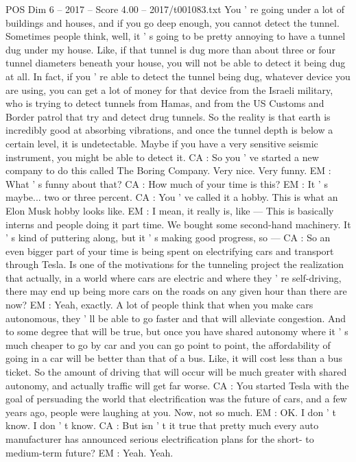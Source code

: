 \begin{textsample}{POS Dim 6 – 2017 – Score 4.00 – 2017/t001083.txt}
You ' re going under a lot of buildings and houses, and if you go deep enough, you cannot detect the tunnel.
Sometimes people think, well, it ' s going to be pretty annoying to have a tunnel dug under my house.
Like, if that tunnel is dug more than about three or four tunnel diameters beneath your house, you will not be able to detect it being dug at all.
In fact, if you ' re able to detect the tunnel being dug, whatever device you are using, you can get a lot of money for that device from the Israeli military, who is trying to detect tunnels from Hamas, and from the US Customs and Border patrol that try and detect drug tunnels.
So the reality is that earth is incredibly good at absorbing vibrations, and once the tunnel depth is below a certain level, it is undetectable.
Maybe if you have a very sensitive seismic instrument, you might be able to detect it.
CA : So you ' ve started a new company to do this called The Boring Company.
Very nice.
Very funny.
EM : What ' s funny about that?
CA : How much of your time is this?
EM : It ' s maybe... two or three percent.
CA : You ' ve called it a hobby.
This is what an Elon Musk hobby looks like.
EM : I mean, it really is, like — This is basically interns and people doing it part time.
We bought some second-hand machinery.
It ' s kind of puttering along, but it ' s making good progress, so — CA : So an even bigger part of your time is being spent on electrifying cars and transport through Tesla.
Is one of the motivations for the tunneling project the realization that actually, in a world where cars are electric and where they ' re self-driving, there may end up being more cars on the roads on any given hour than there are now?
EM : Yeah, exactly.
A lot of people think that when you make cars autonomous, they ' ll be able to go faster and that will alleviate congestion.
And to some degree that will be true, but once you have shared autonomy where it ' s much cheaper to go by car and you can go point to point, the affordability of going in a car will be better than that of a bus.
Like, it will cost less than a bus ticket.
So the amount of driving that will occur will be much greater with shared autonomy, and actually traffic will get far worse.
CA : You started Tesla with the goal of persuading the world that electrification was the future of cars, and a few years ago, people were laughing at you.
Now, not so much.
EM : OK.
I don ' t know.
I don ' t know.
CA : But isn ' t it true that pretty much every auto manufacturer has announced serious electrification plans for the short- to medium-term future?
EM : Yeah.
Yeah.

\end{textsample}
